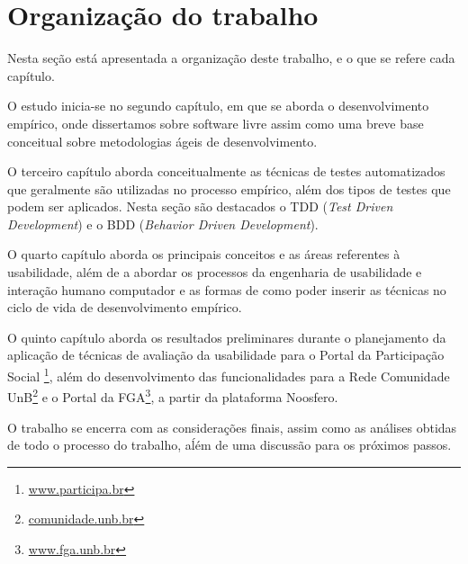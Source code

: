 \section{Organização do trabalho}

Nesta seção está apresentada a organização deste trabalho, e o que se refere cada capítulo.
%

O estudo inicia-se no segundo capítulo, em que se aborda o desenvolvimento empírico, onde dissertamos sobre software livre assim como uma breve base conceitual sobre metodologias ágeis de desenvolvimento.

%
O terceiro capítulo aborda conceitualmente as técnicas de testes automatizados que geralmente são utilizadas no processo empírico, além dos tipos de testes que podem ser aplicados. Nesta seção são destacados o TDD (\textit{Test Driven Development}) e o BDD (\textit{Behavior Driven Development}).

%
O quarto capítulo aborda os principais conceitos e as áreas referentes à usabilidade, além de a abordar os processos da engenharia de usabilidade e interação humano computador e as formas de como poder inserir as técnicas no ciclo de vida de desenvolvimento empírico.

%
O quinto capítulo aborda os resultados preliminares durante o planejamento da aplicação de técnicas de avaliação da usabilidade para o Portal da Participação Social \footnote{\url{www.participa.br}}, além do desenvolvimento das funcionalidades para a Rede Comunidade UnB\footnote{\url{comunidade.unb.br}} e o Portal da FGA\footnote{\url{www.fga.unb.br}}, a partir da plataforma Noosfero.

O trabalho se encerra com as considerações finais, assim como as análises obtidas de todo o processo do trabalho, aĺém de uma discussão para os próximos passos.


